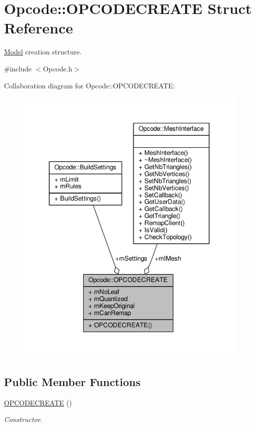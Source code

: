\hypertarget{structOpcode_1_1OPCODECREATE}{}\section{Opcode\+:\+:O\+P\+C\+O\+D\+E\+C\+R\+E\+A\+TE Struct Reference}
\label{structOpcode_1_1OPCODECREATE}


\hyperlink{classOpcode_1_1Model}{Model} creation structure.  




{\ttfamily \#include $<$Opcode.\+h$>$}



Collaboration diagram for Opcode\+:\+:O\+P\+C\+O\+D\+E\+C\+R\+E\+A\+TE\+:
\nopagebreak
\begin{figure}[H]
\begin{center}
\leavevmode
\includegraphics[width=332pt]{da/d1b/structOpcode_1_1OPCODECREATE__coll__graph}
\end{center}
\end{figure}
\subsection*{Public Member Functions}
\begin{DoxyCompactItemize}
\item 
\hyperlink{structOpcode_1_1OPCODECREATE_a7e0b19c00a6986b00db60be7bead9886}{O\+P\+C\+O\+D\+E\+C\+R\+E\+A\+TE} ()
\begin{DoxyCompactList}\small\item\em Constructor. \end{DoxyCompactList}\end{DoxyCompactItemize}
